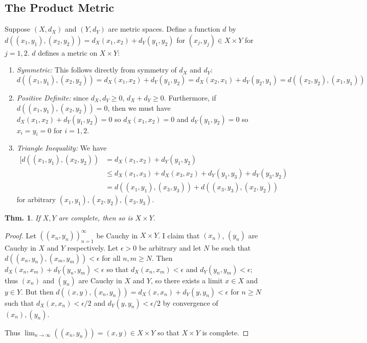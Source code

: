 \documentclass[12pt, a4paper]{book}
\newtheorem{theorem}{Thm.}[section]
\theoremstyle{nonumberplain}
\newtheorem{proof}{Proof}
\begin{document}
\subsection{The Product Metric}
Suppose $(X,d_X)$ and $(Y,d_Y)$ are metric spaces.
Define a function $d$ by $d( (x_1,y_1),(x_2,y_2))= d_X(x_1,x_2)+d_Y(y_1,y_2)$ for $(x_j,y_j)\in X\times Y$ for $j=1,2$.
$d$ defines a metric on $X\times Y$:
\begin{enumerate}
    \item \textit{Symmetric:} This follows directly from symmetry of $d_X$ and $d_Y$:
        \[d( (x_1,y_1),(x_2,y_2) ) = d_X(x_1,x_2)+d_Y(y_1,y_2) = d_X(x_2,x_1)+d_Y(y_2,y_1)=d( (x_2,y_2),(x_1,y_1) )\]
    \item \textit{Positive Definite:} since $d_X,d_Y\geq 0$, $d_X+d_Y\geq 0$. Furthermore, if $d( (x_1,y_1),(x_2,y_2) )=0$,
        then we must have $d_X(x_1,x_2)+d_Y(y_1,y_2)=0$ so $d_X(x_1,x_2)=0$ and $d_Y(y_1,y_2)=0$
        so $x_i=y_i=0$ for $i=1,2$.
    \item \textit{Triangle Inequality:} We have
        \begin{align*}
            [d( (x_1,y_1),(x_2,y_2) ) &= d_X(x_1,x_2)+d_Y(y_1,y_2) \\
                                      &\leq d_X(x_1,x_3)+d_X(x_3,x_2)+d_Y(y_1,y_3)+d_Y(y_3,y_2)\\
                                      &= d( (x_1,y_1),(x_3,y_3)) + d( (x_3,y_3),(x_2,y_2) )
        \end{align*}
        for arbitrary $(x_1,y_1), (x_2,y_2), (x_3,y_3)$.
\end{enumerate}
\begin{theorem}
    If $X,Y$ are complete, then so is $X\times Y$.
\end{theorem}
\begin{proof}
    Let $( (x_n,y_n) )_{n=1}^\infty$ be Cauchy in $X\times Y$. I claim that $(x_n)$, $(y_n)$ are Cauchy
    in $X$ and $Y$ respectively. Let $\epsilon>0$ be arbitrary and let $N$ be such that
    $d( (x_n,y_n),(x_m,y_m) )<\epsilon$ for all $n,m\geq N$. Then $d_X(x_n,x_m)+d_Y(y_n,y_m)<\epsilon$ so that
    $d_X(x_n,x_m)<\epsilon$ and $d_Y(y_n,y_m)<\epsilon$; thus $(x_n)$ and $(y_n)$ are Cauchy in $X$ and $Y$,
    so there exists a limit $x\in X$ and $y\in Y$. But then $d( (x,y),(x_n,y_n) )=d_X(x,x_n)+d_Y(y,y_n)<\epsilon$
    for $n\geq N$ such that $d_X(x,x_n)<\epsilon/2$ and $d_Y(y,y_n)<\epsilon/2$ by convergence of $(x_n),(y_n)$.

    Thus $\lim_{n\to\infty}( (x_n,y_n) )=(x,y)\in X\times Y$ so that $X\times Y$ is complete.
\end{proof}
\end{document}
